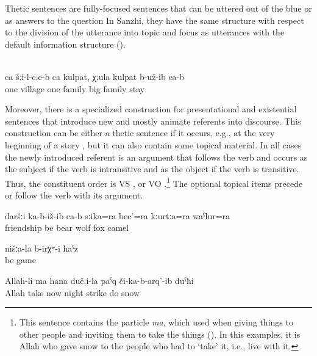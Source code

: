 Thetic sentences are fully-focused sentences that can be uttered out of the blue or as answers to the question  In Sanzhi, they have the same structure with respect to the division of the utterance into topic and focus as utterances with the default information structure  ().
%
\begin{exe}
	\\\label{ex:‎‎In one village there lived a family, a big family}%
	\gll	ca	šːi-l-cːe-b	ca	kulpat,		χːula	kulpat	b-už-ib	ca-b\\
		one	village	one	family	big	family	stay	\\
	\glt	{}
\end{exe}

Moreover, there is a specialized construction for presentational and existential sentences that introduce new and mostly animate referents into discourse. This construction can be either a thetic sentence if it occurs, e.g., at the very beginning of a story , but it can also contain some topical material. In all cases the newly introduced referent is an argument that follows the verb and occurs as the subject if the verb is intransitive and as the object if the verb is transitive. Thus, the constituent order is VS ,  or VO .\footnote{This sentence contains the particle \textit{ma}, which used when giving things to other people and inviting them to take the things (). In this examples, it is Allah who gave snow to the people who had to `take' it, i.e., live with it.} The optional topical items precede or follow the verb with its argument.
%
\begin{exe}
	\ex	\label{ex:‎‎The bear, the wolf, the fox, and the camel were friends}
	\gll	daršːi	ka-b-iž-ib	ca-b	sːika=ra	bec'=ra	 kːurtːa=ra	waˁlur=ra\\
		friendship	be		bear\tsc{=add}	wolf	fox camel\\
	\glt	{}

	\ex	\label{ex:We had a game}
	\gll	nišːa-la	b-irχʷ-i	ħaˁz\\
			be	game\\
	\glt	{}

	\ex	\label{ex:Allah sent snow during the night}
	\gll	Allah-li	ma	hana	dučːi-la	paˁq	či-ka-b-arq'-ib	duˁħi\\
		Allah	take	now	night	strike	do	snow\\
	\glt	{}
\end{exe}


